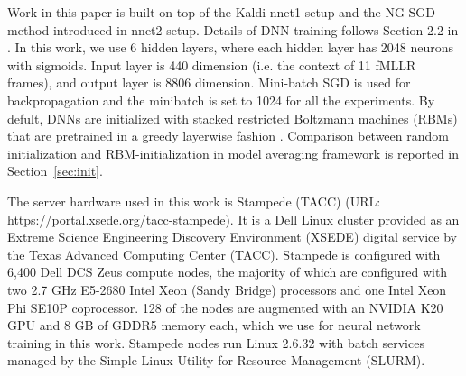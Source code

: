 \documentclass{article}
\begin{document}
Work in this paper is built on top of the Kaldi nnet1 setup and the NG-SGD method introduced in nnet2 setup. 
Details of DNN training follows Section 2.2 in \cite{vesely2013sequence}. In this work, we use 6 hidden layers, where each 
hidden layer has 2048 neurons with sigmoids. Input layer is 440 dimension (i.e. the context of 11 fMLLR frames), 
and output layer is 8806 dimension. Mini-batch SGD is used for backpropagation and the minibatch is set to 1024 for all
the experiments. By defult, DNNs are initialized with stacked restricted Boltzmann machines (RBMs) that are pretrained 
in a greedy layerwise fashion \cite{hinton2006fast}. Comparison between random initialization and RBM-initialization 
in model averaging framework is reported in Section~\ref{sec:init}.

The server hardware used in this work is Stampede (TACC) (URL: https://portal.xsede.org/tacc-stampede). It is a Dell Linux 
cluster provided as an Extreme Science Engineering Discovery Environment (XSEDE) digital service by the Texas Advanced 
Computing Center (TACC). Stampede is configured with 6,400 Dell DCS Zeus compute nodes, the majority of which are configured
with two 2.7 GHz E5-2680 Intel Xeon (Sandy Bridge) processors and one Intel Xeon Phi SE10P coprocessor. 128 of the nodes are 
augmented with an NVIDIA K20 GPU and 8 GB of GDDR5 memory each, which we use for neural network training in this work.
Stampede nodes run Linux 2.6.32 with batch services managed by the Simple Linux Utility for Resource Management (SLURM).
\end{document}
